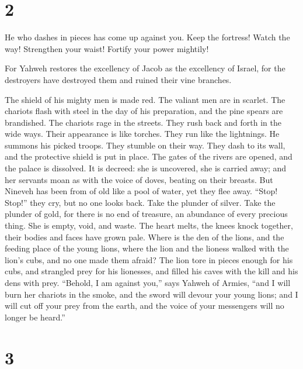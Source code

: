 \hypertarget{section-1}{%
\section{2}\label{section-1}}

 He who dashes in pieces has come up against you. Keep the
fortress! Watch the way! Strengthen your waist! Fortify your power
mightily!

 For Yahweh restores the excellency of Jacob as the
excellency of Israel, for the destroyers have destroyed them and ruined
their vine branches.

 The shield of his mighty men is made red. The valiant men
are in scarlet. The chariots flash with steel in the day of his
preparation, and the pine spears are brandished.  The
chariots rage in the streets. They rush back and forth in the wide ways.
Their appearance is like torches. They run like the lightnings.
 He summons his picked troops. They stumble on their way.
They dash to its wall, and the protective shield is put in place.
 The gates of the rivers are opened, and the palace is
dissolved.  It is decreed: she is uncovered, she is
carried away; and her servants moan as with the voice of doves, beating
on their breasts.  But Nineveh has been from of old like a
pool of water, yet they flee away. ``Stop! Stop!'' they cry, but no one
looks back.  Take the plunder of silver. Take the plunder
of gold, for there is no end of treasure, an abundance of every precious
thing.  She is empty, void, and waste. The heart melts,
the knees knock together, their bodies and faces have grown pale.
 Where is the den of the lions, and the feeding place of
the young lions, where the lion and the lioness walked with the lion's
cubs, and no one made them afraid?  The lion tore in
pieces enough for his cubs, and strangled prey for his lionesses, and
filled his caves with the kill and his dens with prey. 
``Behold, I am against you,'' says Yahweh of Armies, ``and I will burn
her chariots in the smoke, and the sword will devour your young lions;
and I will cut off your prey from the earth, and the voice of your
messengers will no longer be heard.''

\hypertarget{section-2}{%
\section{3}\label{section-2}}

